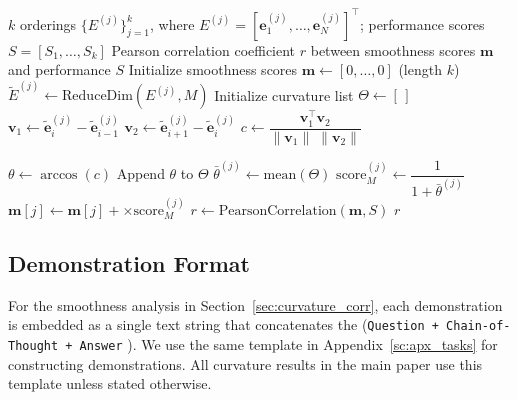 \documentclass{article}
\theoremstyle{plain}
\theoremstyle{definition}
\theoremstyle{remark}
\begin{document}
\begin{algorithm}[tb]
  \caption{Curvature--Performance Correlation Analysis}
  
  \label{alg:curvature-correlation}
  \begin{algorithmic}
  \footnotesize
     $k$ orderings $\{E^{(j)}\}_{j=1}^k$, where $E^{(j)} = [\mathbf{e}^{(j)}_1,\ldots,\mathbf{e}^{(j)}_N]^\top$; performance scores $S=[S_1,\ldots,S_k]$
     Pearson correlation coefficient $r$ between smoothness scores $\mathbf{m}$ and performance $S$
    \STATE Initialize smoothness scores $\mathbf{m} \leftarrow [0,\ldots,0]$ (length $k$)
        \STATE $\tilde{E}^{(j)} \leftarrow \mathrm{ReduceDim}(E^{(j)}, M)$
        \STATE Initialize curvature list $\Theta \leftarrow [\,]$
          \STATE $\mathbf{v}_1 \leftarrow \tilde{\mathbf{e}}^{(j)}_{i} - \tilde{\mathbf{e}}^{(j)}_{i-1}$
          \STATE $\mathbf{v}_2 \leftarrow \tilde{\mathbf{e}}^{(j)}_{i+1} - \tilde{\mathbf{e}}^{(j)}_{i}$
            \STATE $c \leftarrow \dfrac{\mathbf{v}_1^\top \mathbf{v}_2}{\|\mathbf{v}_1\|\;\|\mathbf{v}_2\|}$

            \STATE $\theta \leftarrow \arccos(c)$
            \STATE Append $\theta$ to $\Theta$
          \ENDIF
        \ENDFOR
        \STATE $\bar{\theta}^{(j)} \leftarrow \mathrm{mean}(\Theta)$
        \STATE $\mathrm{score}^{(j)}_{M} \leftarrow \dfrac{1}{1+\bar{\theta}^{(j)}}$
        \STATE $\mathbf{m}[j] \leftarrow \mathbf{m}[j] + \times \mathrm{score}^{(j)}_{M}$ 
      \ENDFOR
    \ENDFOR
    \STATE $r \leftarrow \mathrm{PearsonCorrelation}(\mathbf{m}, S)$
     $r$
  \end{algorithmic}
\end{algorithm}


\subsection{Demonstration Format}
\label{sec:demo_template}
For the smoothness analysis in Section~\ref{sec:curvature_corr}, each demonstration is embedded as a single text string that concatenates the (\texttt{Question + Chain-of-Thought + Answer} ).
We use the same template in Appendix~\ref{sc:apx_tasks} for constructing demonstrations. All curvature results in the main paper use this template unless stated otherwise.
\end{document}
